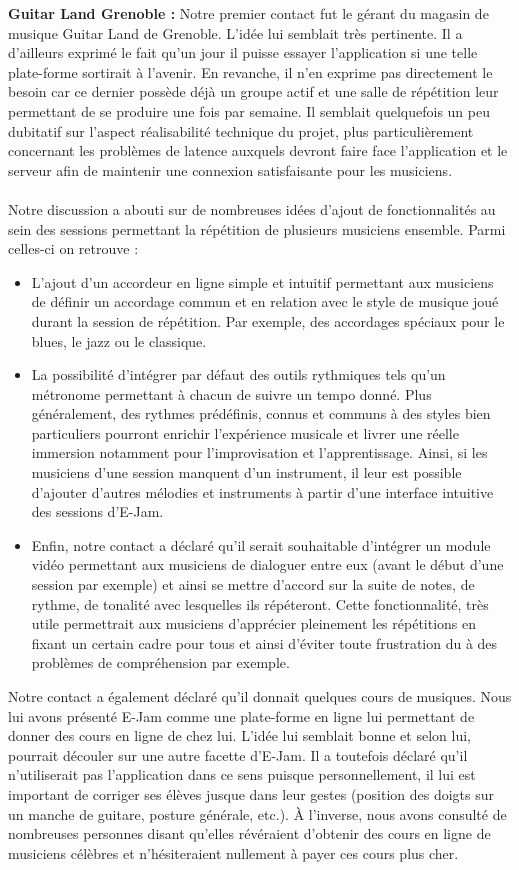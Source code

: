 \documentclass[a4,12pt]{article}
\begin{document}
\textbf{Guitar Land Grenoble :}
    Notre premier contact fut le gérant du magasin de musique Guitar Land de Grenoble. L'idée lui semblait très pertinente. Il a d'ailleurs exprimé le fait qu'un jour il puisse essayer l'application si une telle plate-forme sortirait à l'avenir. En revanche, il n'en exprime pas directement le besoin car ce dernier possède déjà un groupe actif et une salle de répétition leur permettant de se produire une fois par semaine. Il semblait quelquefois un peu dubitatif sur l'aspect réalisabilité technique du projet, plus particulièrement concernant les problèmes de latence auxquels devront faire face l'application et le serveur afin de maintenir une connexion satisfaisante pour les musiciens.\\
    \\
    Notre discussion a abouti sur de nombreuses idées d'ajout de fonctionnalités au sein des sessions permettant la répétition de plusieurs musiciens ensemble. Parmi celles-ci on retrouve :
    \begin{itemize}
        \item L'ajout d'un accordeur en ligne simple et intuitif permettant aux musiciens de définir un accordage commun et en relation avec le style de musique joué durant la session de répétition. Par exemple, des accordages spéciaux pour le blues, le jazz ou le classique.
        \item La possibilité d'intégrer par défaut des outils rythmiques tels qu'un métronome permettant à chacun de suivre un tempo donné. Plus généralement, des rythmes prédéfinis, connus et communs à des styles bien particuliers pourront enrichir l'expérience musicale et livrer une réelle immersion notamment pour l'improvisation et l'apprentissage. Ainsi, si les musiciens d'une session manquent d'un instrument, il leur est possible d'ajouter d'autres mélodies et instruments à partir d'une interface intuitive des sessions d'E-Jam.
        \item Enfin, notre contact a déclaré qu'il serait souhaitable d'intégrer un module vidéo permettant aux musiciens de dialoguer entre eux (avant le début d'une session par exemple) et ainsi se mettre d'accord sur la suite de notes, de rythme, de tonalité avec lesquelles ils répéteront. Cette fonctionnalité, très utile permettrait aux musiciens d'apprécier pleinement les répétitions en fixant un certain cadre pour tous et ainsi d'éviter toute frustration du à des problèmes de compréhension par exemple.
    \end{itemize}
Notre contact a également déclaré qu'il donnait quelques cours de musiques. Nous lui avons présenté E-Jam comme une plate-forme en ligne lui permettant de donner des cours en ligne de chez lui. L'idée lui semblait bonne et selon lui, pourrait découler sur une autre facette d'E-Jam. Il a toutefois déclaré qu'il n'utiliserait pas l'application dans ce sens puisque personnellement, il lui est important de corriger ses élèves jusque dans leur gestes (position des doigts sur un manche de guitare, posture générale, etc.). À l'inverse, nous avons consulté de nombreuses personnes disant qu'elles révéraient d'obtenir des cours en ligne de musiciens célèbres et n'hésiteraient nullement à payer ces cours plus cher.\\
\end{document}
